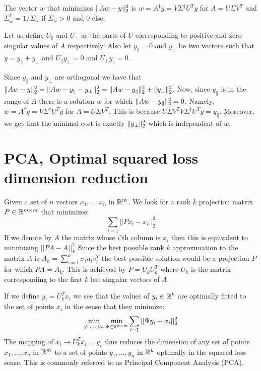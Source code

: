\documentclass{article}
\begin{document}
\begin{proposition}
The vector $w$ that minimizes $\| Aw - y \|_{2}^{2}$ is $w = A^{\dagger}y = V\Sigma^{\dagger}U^{T}y$
for $A = U\Sigma V^T$ and $\Sigma^{\dagger}_{ii} = 1/\Sigma_{ii}$ if $\Sigma_{ii} > 0$ and $0$ else. 
\end{proposition}

Let us define $U_{\parallel}$ and $U_{\perp}$ as the parts of $U$ corresponding to positive and zero singular values of $A$ respectively. 
Also let $y_{\parallel} = 0$ and $y_{\perp}$ be two vectors such that $y = y_{\parallel}+y_{\perp}$ and 
$U_{\parallel}y_{\perp} = 0$ and $U_{\perp}y_{\parallel}=0$.

Since $y_{\parallel}$ and $y_{\perp}$ are orthogonal we have that  $\| Aw - y \|_{2}^{2}
= \| Aw - y_{\parallel}-y_{\perp} \|_{2}^{2} = \| Aw - y_{\parallel} \|_{2}^{2} + \| y_{\perp} \|_{2}^{2}$.
Now, since $y_{\parallel}$ is in the range of $A$ there is a solution $w$ for which $\| Aw - y_{\parallel} \|_{2}^{2} = 0$.
Namely, $w = A^{\dagger}y = V\Sigma^{\dagger}U^{T}y$ for $A = U\Sigma V^{T}$. This is because $U\Sigma V^{T}V\Sigma^{\dagger}U^{T}y = y_{\parallel}$.
Moreover, we get that the minimal cost is exactly $ \| y_{\perp} \|_{2}^{2}$ which is independent of $w$.


\section{PCA, Optimal squared loss dimension reduction}

Given a set of $n$ vectors $x_1,\ldots,x_n$ in ${\mathbb{R}}^{m}$. We look for a rank $k$ 
projection matrix $P \in {\mathbb{R}}^{m \times m}$ that minimizes:
\[
\sum_{i=1} ||Px_{i} - x_{i}||_{2}^{2}
\]
If we denote by $A$ the matrix whose $i$'th column is $x_i$ then this is equivalent to minimizing $||PA - A||_{F}^{2}$
Since the best possible rank $k$ approximation to the matrix $A$ is $A_{k} = \sum_{i=1}^{k}\sigma_{i}u_{i}v_{i}^{T}$ the best
possible solution would be a projection $P$ for which $PA = A_{k}$. This is achieved by $P = U_{k}U_{k}^{T}$ where $U_{k}$
is the matrix corresponding to the first $k$ left singular vectors of $A$. 

If we define $y_i = U_{k}^{T}x_{i}$ we see that the values of $y_i \in {\mathbb{R}}^{k}$ are optimally fitted to the set of points $x_i$ in the 
sense that they minimize:
\[
\min_{y_1,\ldots,y_n } \min_{\Psi \in {\mathbb{R}}^{k \times m}}\sum_{i=1} ||\Psi y_i - x_{i}||_{2}^{2}
\] 
The mapping of $x_i \rightarrow  U_{k}^{T}x_i = y_i $ thus reduces the dimension of any set of points  $x_1,\ldots,x_n$ in ${\mathbb{R}}^{m}$ to 
a set of points $y_1,\ldots,y_n$ in ${\mathbb{R}}^{k}$ optimally in the squared loss sense. This is commonly referred to as Principal Component Analysis (PCA).
\end{document}
